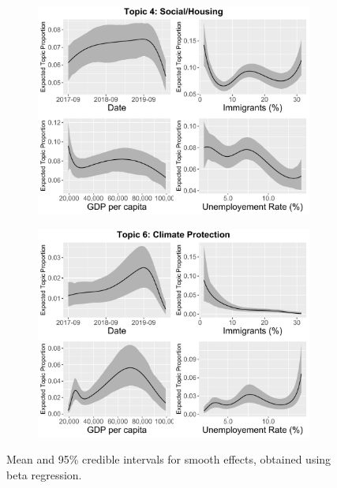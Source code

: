 \begin{figure}[h!]
  \centering
  \begin{subfigure}[b]{0.4\linewidth}
    \includegraphics[width=\linewidth]{../plots/appendix/5_1/beta_t4_cont.pdf}
  \end{subfigure}
  \begin{subfigure}[b]{0.4\linewidth}
    \includegraphics[width=\linewidth]{../plots/appendix/5_1/beta_t6_cont.pdf}
  \end{subfigure}
  \caption{Mean and 95\% credible intervals for smooth effects, obtained using beta regression.}
  \label{fig:coffee}
\end{figure}

